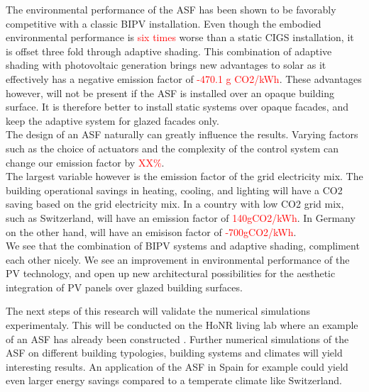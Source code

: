 
The environmental performance of the ASF has been shown to be favorably competitive with a classic BIPV installation. Even though the embodied environmental performance is \textcolor{red}{six times} worse than a static CIGS installation, it is offset three fold through adaptive shading. This combination of adaptive shading with photovoltaic generation brings new advantages to solar as it effectively has a negative emission factor of \textcolor{red}{-470.1 g CO2/kWh}. These advantages however, will not be present if the ASF is installed over an opaque building surface. It is therefore better to install static systems over opaque facades, and keep the adaptive system for glazed facades only. \\

The design of an ASF naturally can greatly influence the results. Varying factors such as the choice of actuators and the complexity of the control system can change our emission factor by \textcolor{red}{XX\%}.\\
The largest variable however is the emission factor of the grid electricity mix. The building operational savings in heating, cooling, and lighting will have a CO2 saving based on the grid electricity mix. In a country with low CO2 grid mix, such as Switzerland, will have an emission factor of \textcolor{red}{140gCO2/kWh}. In Germany on the other hand, will have an emisison factor of \textcolor{red}{-700gCO2/kWh}.\\

We see that the combination of BIPV systems and adaptive shading, compliment each other nicely. We see an improvement in environmental performance of the PV technology, and open up new architectural possibilities for the aesthetic integration of PV panels over glazed building surfaces. 

The next steps of this research will validate the numerical simulations experimentaly. This will be conducted on the HoNR living lab where an example of an ASF has already been constructed \cite{nagy2015frontiers}. Further numerical simulations of the ASF on different building typologies, building systems and climates will yield interesting results. An application of the ASF in Spain for example could yield even larger energy savings compared to a temperate climate like Switzerland.


